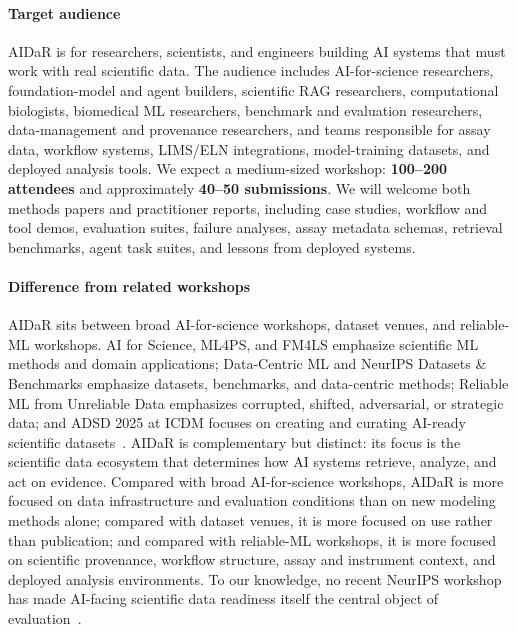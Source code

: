 \documentclass[10pt]{article}
\begin{document}
\paragraph{Target audience}
AIDaR is for researchers, scientists, and engineers building AI systems that must work with real scientific data. The audience includes AI-for-science researchers, foundation-model and agent builders, scientific RAG researchers, computational biologists, biomedical ML researchers, benchmark and evaluation researchers, data-management and provenance researchers, and teams responsible for assay data, workflow systems, LIMS/ELN integrations, model-training datasets, and deployed analysis tools. We expect a medium-sized workshop: \textbf{100--200 attendees} and approximately \textbf{40--50 submissions}. We will welcome both methods papers and practitioner reports, including case studies, workflow and tool demos, evaluation suites, failure analyses, assay metadata schemas, retrieval benchmarks, agent task suites, and lessons from deployed systems.

\paragraph{Difference from related workshops} 
\label{sec:relationship}

AIDaR sits between broad AI-for-science workshops, dataset venues, and reliable-ML workshops. AI for Science, ML4PS, and FM4LS emphasize scientific ML methods and domain applications; Data-Centric ML and NeurIPS Datasets \& Benchmarks emphasize datasets, benchmarks, and data-centric methods; Reliable ML from Unreliable Data emphasizes corrupted, shifted, adversarial, or strategic data; and ADSD 2025 at ICDM focuses on creating and curating AI-ready scientific datasets~\cite{ai4science2025,ml4ps2025,fm4ls2025,dmlr2025,reliableml2025,adsd2025}. AIDaR is complementary but distinct: its focus is the scientific data ecosystem that determines how AI systems retrieve, analyze, and act on evidence. Compared with broad AI-for-science workshops, AIDaR is more focused on data infrastructure and evaluation conditions than on new modeling methods alone; compared with dataset venues, it is more focused on use rather than publication; and compared with reliable-ML workshops, it is more focused on scientific provenance, workflow structure, assay and instrument context, and deployed analysis environments. To our knowledge, no recent NeurIPS workshop has made AI-facing scientific data readiness itself the central object of evaluation~\cite{brewer2025scientific, brewer2026pipeline, majithia2026actionable}.
\end{document}
